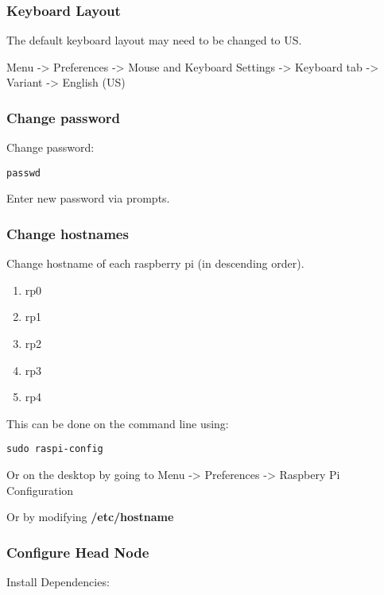 \subsubsection{Keyboard Layout}

The default keyboard layout may need to be changed to US.

Menu -\textgreater{} Preferences -\textgreater{} Mouse and Keyboard
Settings -\textgreater{} Keyboard tab -\textgreater{} Variant
-\textgreater{} English (US)

\subsubsection{Change password}

Change password:

\begin{lstlisting}
passwd
\end{lstlisting}

Enter new password via prompts.

\subsubsection{Change hostnames}

Change hostname of each raspberry pi (in descending order).

\begin{enumerate}
\def\labelenumi{\arabic{enumi}.}
\item
  rp0
\item
  rp1
\item
  rp2
\item
  rp3
\item
  rp4
\end{enumerate}

This can be done on the command line using:

\begin{lstlisting}
sudo raspi-config
\end{lstlisting}

Or on the desktop by going to Menu -\textgreater{} Preferences
-\textgreater{} Raspbery Pi Configuration

Or by modifying \textbf{/etc/hostname}

\subsubsection{Configure Head Node}

Install Dependencies:

